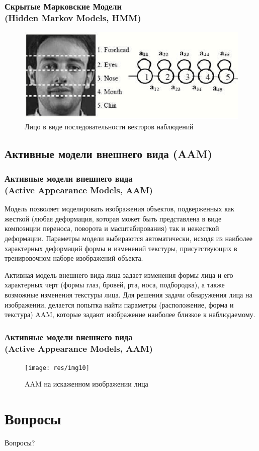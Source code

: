 \documentclass{beamer}
\begin{document}
\begin{frame}
\frametitle{Скрытые Марковские Модели\\(Hidden Markov Models, HMM)}

\begin{figure}
\includegraphics[scale=0.8]{res/img09}
\caption{Лицо в виде последовательности векторов наблюдений}
\end{figure}
\end{frame}

\subsection{Активные модели внешнего вида (AAM)}

\begin{frame}
\frametitle{Активные модели внешнего вида\\(Active Appearance Models, AAM)}

Модель позволяет моделировать изображения объектов, подверженных как жесткой (любая деформация, которая может быть представлена в виде композиции переноса, поворота и масштабирования) так и нежесткой деформации. Параметры модели выбираются автоматически, исходя из наиболее характерных деформаций формы и изменений текстуры, присутствующих в тренировочном наборе изображений объекта.
\bigskip

Активная модель внешнего вида лица задает изменения формы лица и его характерных черт (формы глаз, бровей, рта, носа, подбородка), а также возможные изменения текстуры лица. Для решения задачи обнаружения лица на изображении, делается попытка найти параметры (расположение, форма и текстура) AAM, которые задают изображение наиболее близкое к наблюдаемому.
\end{frame}

\begin{frame}
\frametitle{Активные модели внешнего вида\\(Active Appearance Models, AAM)}

\begin{figure}
\texttt{[image: res/img10]}
\caption{AAM на искаженном изображении лица}
\end{figure}
\end{frame}

\section{Вопросы}

\begin{frame}
\Huge{\centerline{Вопросы?}}
\end{frame}

\end{document}
